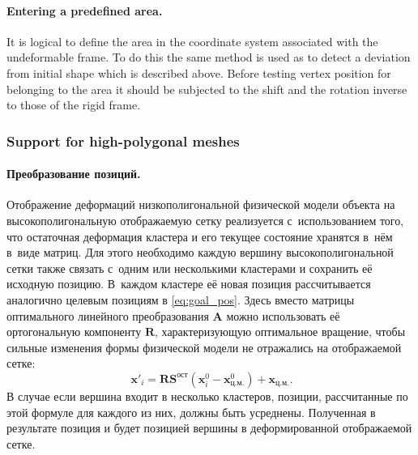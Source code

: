 \documentclass[a4paper, 12pt, titlepage]{extarticle}
\newcommand{\vect}[1]{\mathbf{#1}} %
\newcommand{\matx}[1]{\mathbf{#1}} %
\begin{document}
        \paragraph{Entering a predefined area.}
        It is logical to define the area in the coordinate system associated with the undeformable
        frame. To do this the same method is used as to detect a deviation from initial shape which
        is described above. Before testing vertex position for belonging to the area it should be
        subjected to the shift and the rotation inverse to those of the rigid frame.

      \subsubsection{Support for high-polygonal meshes}\label{sssec:hi-poly}

\begin{original}
        \paragraph{Преобразование позиций.}
        Отображение деформаций низкополигональной физической модели объекта на высокополигональную
        отображаемую сетку реализуется с~использованием того, что остаточная деформация кластера и
        его текущее состояние хранятся в~нём в~виде матриц.  Для этого необходимо каждую вершину
        высокополигональной сетки также связать с~одним или несколькими кластерами и сохранить её
        исходную позицию. В~каждом кластере её новая позиция рассчитывается аналогично целевым
        позициям в \eqref{eq:goal_pos}. Здесь вместо матрицы оптимального линейного преобразования
        $\matx A$ можно использовать её ортогональную компоненту $\matx R$, характеризующую
        оптимальное вращение, чтобы сильные изменения формы физической модели не отражались на
        отображаемой сетке:
        \begin{equation}\
          \vect{x}'_i = \matx{R} \matx{S}^{ост} (\vect{x}^0_i - \vect{x}^0_{ц.м.}) + \vect{x}_{ц.м.}.
        \end{equation}
        В случае если вершина входит в несколько кластеров, позиции, рассчитанные по этой формуле
        для каждого из них, должны быть усреднены. Полученная в результате позиция и будет позицией
        вершины в деформированной отображаемой сетке.
\end{original}
\end{document}

